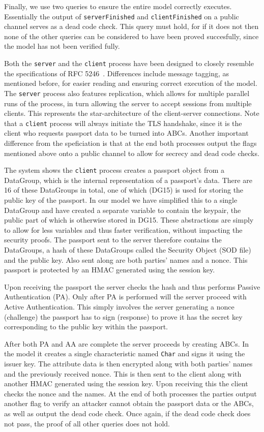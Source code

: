 Finally, we use two queries to ensure the entire model correctly executes. Essentially the output of \texttt{serverFinished} and \texttt{clientFinished} on a public channel serves as a dead code check. This query must hold, for if it does not then none of the other queries can be considered to have been proved succesfully, since the model has not been verified fully.

Both the \texttt{server} and the \texttt{client} process have been designed to closely resemble the specifications of RFC 5246~\cite{tls1.2}. Differences include message tagging, as mentioned before, for easier reading and ensuring correct execution of the model. The \texttt{server} process also features replication, which allows for multiple parallel runs of the process, in turn allowing the server to accept sessions from multiple clients. This represents the star-architecture of the client-server connections. Note that a \texttt{client} process will always initiate the TLS handshake, since it is the client who requests passport data to be turned into ABCs. Another important difference from the speficiation is that at the end both processes output the flags mentioned above onto a public channel to allow for secrecy and dead code checks.

The system shows the \texttt{client} process creates a passport object from a DataGroup, which is the internal representation of a passport's data. There are 16 of these DataGroups in total, one of which (DG15) is used for storing the public key of the passport. In our model we have simplified this to a single DataGroup and have created a separate variable to contain the keypair, the public part of which is otherwise stored in DG15. These abstractions are simply to allow for less variables and thus faster verification, without impacting the security proofs. The passport sent to the server therefore contains the DataGroups, a hash of these DataGroups called the Security Object (SOD file) and the public key. Also sent along are both parties' names and a nonce. This passport is protected by an HMAC generated using the session key.

Upon receiving the passport the server checks the hash and thus performs Passive Authentication (PA). Only after PA is performed will the server proceed with Active Authentication. This simply involves the server generating a nonce (challenge) the passport has to sign (response) to prove it has the secret key corresponding to the public key within the passport. 

After both PA and AA are complete the server proceeds by creating ABCs. In the model it creates a single characteristic named \texttt{Char} and signs it using the issuer key. The attribute data is then encrypted along with both parties' names and the previously received nonce. This is then sent to the client along with another HMAC generated using the session key. Upon receiving this the client checks the nonce and the names. At the end of both processes the parties output another flag to verify an attacker cannot obtain the passport data or the ABCs, as well as output the dead code check. Once again, if the dead code check does not pass, the proof of all other queries does not hold.


